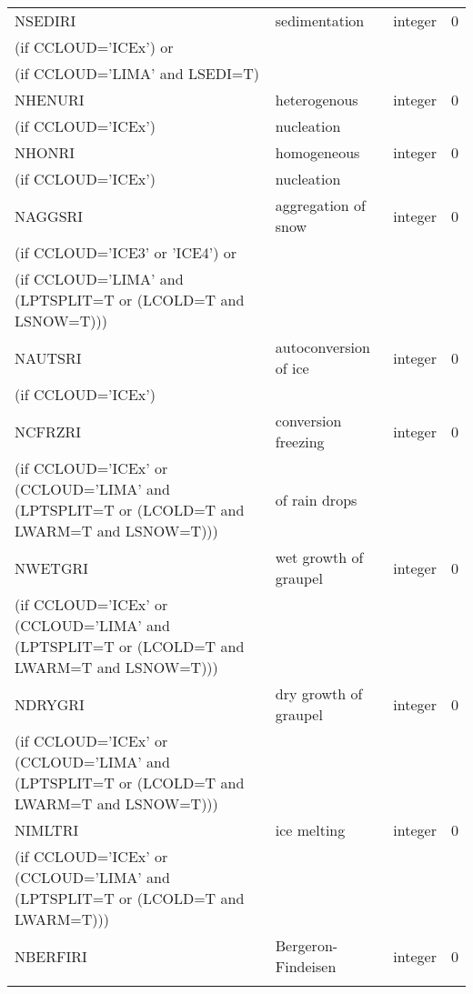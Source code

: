 \begin{longtable} {|p{}|p{}|>{\centering}p{}|p{}<{\centering}|}
NSEDIRI  & sedimentation  & integer  &  0 \index{NSEDIRI!\innam{NAM\_BU\_RRI}}\\ \nopagebreak
(if CCLOUD='ICEx') or & &   &  \\ \nopagebreak
(if CCLOUD='LIMA' and LSEDI=T) & &   &  \\\hline
NHENURI  & heterogenous   & integer  &  0 \index{NHENURI!\innam{NAM\_BU\_RRI}}\\ \nopagebreak
(if CCLOUD='ICEx') &nucleation &   &  \\\hline
NHONRI  & homogeneous   & integer  &  0 \index{NHONRI!\innam{NAM\_BU\_RRI}}\\ \nopagebreak
(if CCLOUD='ICEx') &nucleation &   &  \\\hline
NAGGSRI & aggregation of snow & integer  &  0 \index{NAGGSRI!\innam{NAM\_BU\_RRI}}\\ \nopagebreak
(if CCLOUD='ICE3' or 'ICE4') or & &   &  \\ \nopagebreak
(if CCLOUD='LIMA' and (LPTSPLIT=T or (LCOLD=T and LSNOW=T))) & &   &  \\\hline
NAUTSRI & autoconversion of ice & integer  &  0 \index{NAUTSRI!\innam{NAM\_BU\_RRI}}\\ \nopagebreak
(if CCLOUD='ICEx') & &   &  \\\hline
NCFRZRI &   conversion freezing  & integer  &  0 \index{NCFRZRI!\innam{NAM\_BU\_RRI}}\\ \nopagebreak
(if CCLOUD='ICEx' or (CCLOUD='LIMA' and (LPTSPLIT=T or (LCOLD=T and LWARM=T and LSNOW=T))) & of rain drops & & \\\hline
NWETGRI &   wet growth of graupel & integer  &  0 \index{NWETGRI!\innam{NAM\_BU\_RRI}}\\ \nopagebreak
(if CCLOUD='ICEx' or (CCLOUD='LIMA' and (LPTSPLIT=T or (LCOLD=T and LWARM=T and LSNOW=T))) & & & \\\hline
NDRYGRI &   dry growth of graupel & integer  &  0 \index{NDRYGRI!\innam{NAM\_BU\_RRI}}\\ \nopagebreak
(if CCLOUD='ICEx' or (CCLOUD='LIMA' and (LPTSPLIT=T or (LCOLD=T and LWARM=T and LSNOW=T))) & & & \\\hline
NIMLTRI &   ice melting & integer  &  0 \index{NIMLRI!\innam{NAM\_BU\_RRI}}\\ \nopagebreak
(if CCLOUD='ICEx' or (CCLOUD='LIMA' and (LPTSPLIT=T or (LCOLD=T and LWARM=T))) & &   &  \\\hline
NBERFIRI&   Bergeron-Findeisen & integer  &  0 \index{NBERFIRI!\innam{NAM\_BU\_RRI}}\\ \nopagebreak

\end{longtable}
